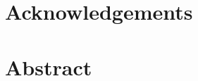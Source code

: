 \documentclass[12pt,twoside]{book}
\renewcommand{\&}{\textup{\symbol{`\&}}}
\begin{document}
\chapter*{Acknowledgements}
\thispagestyle{empty}



\chapter*{Abstract}






\tableofcontents
\listoffigures
\listoftables

\mainmatter %







\appendix



\end{document}
